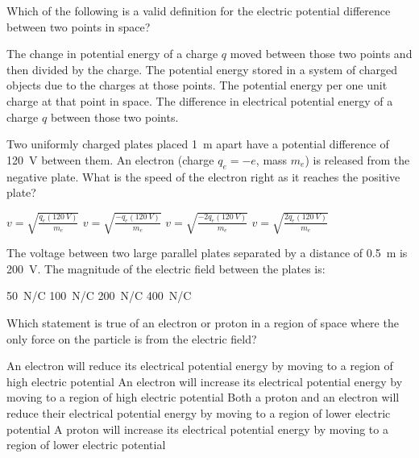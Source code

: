 \question Which of the following is a valid definition for the electric potential difference between two points in space?
\begin{checkboxes}
	\CorrectChoice The change in potential energy of a charge $q$ moved between those two points and then divided by the charge.
	\choice The potential energy stored in a system of charged objects due to the charges at those points.
	\choice  The potential energy per one unit charge at that point in space.
	\choice The difference in electrical potential energy of a charge $q$ between those two points. 
\end{checkboxes}

\question Two uniformly charged plates placed \SI{1}{m} apart have a potential difference of \SI{120}{V} between them. An electron (charge $q_e=-e$, mass $m_e$) is released from the negative plate. What is the speed of the electron right as it reaches the positive plate?
\begin{checkboxes}
	\choice $v=\sqrt{\frac{q_e(\SI{120}{V})}{m_e}}$
	\choice $v=\sqrt{\frac{-q_e(\SI{120}{V})}{m_e}}$
	\CorrectChoice  $v=\sqrt{\frac{-2q_e(\SI{120}{V})}{m_e}}$
	\choice $v=\sqrt{\frac{2q_e(\SI{120}{V})}{m_e}}$
\end{checkboxes}

\question The voltage between two large parallel plates separated by a distance of \SI{0.5}{m} is \SI{200}{V}. The magnitude of the electric field between the plates is:
\begin{checkboxes}
	\choice \SI{50}{N/C}
	\choice \SI{100}{N/C}
	\choice  \SI{200}{N/C}
	\CorrectChoice \SI{400}{N/C}
\end{checkboxes}


\question Which statement is true of an electron or proton in a region of space where the only force on the particle is from the electric field?
\begin{checkboxes}
\CorrectChoice An electron will reduce its electrical potential energy by moving to a region of high electric potential \correct
\choice An electron will increase its electrical potential energy by moving to a region of high electric potential
\choice Both a proton and an electron will reduce their electrical potential energy by moving to a region of lower electric potential
\choice A proton will increase its electrical potential energy by moving to a region of lower electric potential
\end{checkboxes}


